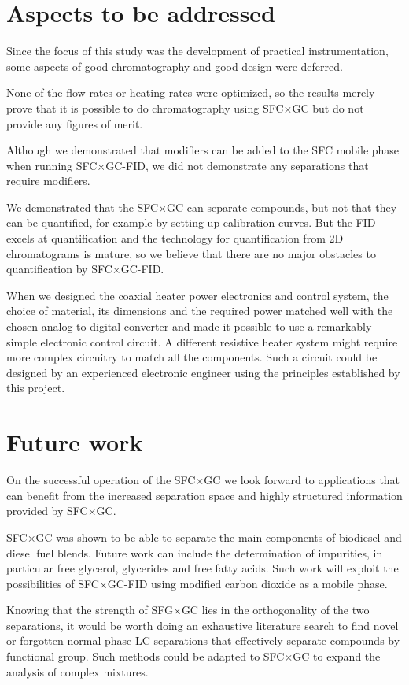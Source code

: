 \section{Aspects to be addressed} 

Since the focus of this study was the development of practical instrumentation,
some aspects of good chromatography and good design were deferred.

None of the flow rates or heating rates were optimized, so the results merely
prove that it is possible to do chromatography using SFC×GC but do not provide
any figures of merit.

Although we demonstrated that modifiers can be added to the SFC mobile phase
when running SFC×GC-FID, we did not demonstrate any separations that require
modifiers.

We demonstrated that the SFC×GC can separate compounds, but not that they can be
quantified, for example by setting up calibration curves. But the FID excels at
quantification and the technology for quantification from 2D chromatograms is
mature, so we believe that there are no major obstacles to quantification by
SFC×GC-FID.

When we designed the coaxial heater power electronics and control system, the
choice of material, its dimensions and the required power matched well with the
chosen analog-to-digital converter and made it possible to use a remarkably
simple electronic control circuit. A different resistive heater system might
require more complex circuitry to match all the components. Such a circuit could
be designed by an experienced electronic engineer using the principles
established by this project.

\section{Future work}

On the successful operation of the SFC×GC we look forward to applications that
can benefit from the increased separation space and highly structured
information provided by SFC×GC.

SFC×GC was shown to be able to separate the main components of biodiesel and
diesel fuel blends. Future work can include the determination of impurities, in
particular free glycerol, glycerides and free fatty acids. Such work will
exploit the possibilities of SFC×GC-FID using modified carbon dioxide as a
mobile phase.

Knowing that the strength of SFG×GC lies in the orthogonality of the two
separations, it would be worth doing an exhaustive literature search to find
novel or forgotten normal-phase LC separations that effectively separate
compounds by functional group. Such methods could be adapted to SFC×GC to expand
the analysis of complex mixtures.

